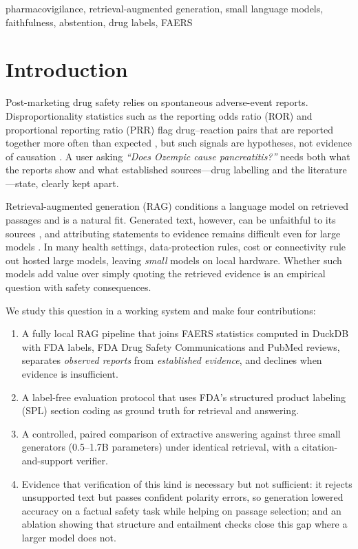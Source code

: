 \documentclass[conference]{IEEEtran}
\begin{document}
\begin{IEEEkeywords}
pharmacovigilance, retrieval-augmented generation, small language models, faithfulness, abstention, drug labels, FAERS
\end{IEEEkeywords}

\section{Introduction}
Post-marketing drug safety relies on spontaneous adverse-event reports. Disproportionality statistics such as the reporting odds ratio (ROR) and proportional reporting ratio (PRR) flag drug--reaction pairs that are reported together more often than expected \cite{evans2001prr,vanpuijenbroek2002ror,noren2013shrinkage}, but such signals are hypotheses, not evidence of causation \cite{hauben2009signal}. A user asking \emph{``Does Ozempic cause pancreatitis?''} needs both what the reports show and what established sources---drug labelling and the literature---state, clearly kept apart.

Retrieval-augmented generation (RAG) \cite{lewis2020rag} conditions a language model on retrieved passages and is a natural fit. Generated text, however, can be unfaithful to its sources \cite{maynez2020faithfulness,ji2023hallucination}, and attributing statements to evidence remains difficult even for large models \cite{gao2023alce,rashkin2023ais}. In many health settings, data-protection rules, cost or connectivity rule out hosted large models, leaving \emph{small} models on local hardware. Whether such models add value over simply quoting the retrieved evidence is an empirical question with safety consequences.

We study this question in a working system and make four contributions:
\begin{enumerate}
\item A fully local RAG pipeline that joins FAERS statistics computed in DuckDB with FDA labels, FDA Drug Safety Communications and PubMed reviews, separates \emph{observed reports} from \emph{established evidence}, and declines when evidence is insufficient.
\item A label-free evaluation protocol that uses FDA's structured product labeling (SPL) section coding as ground truth for retrieval and answering.
\item A controlled, paired comparison of extractive answering against three small generators (0.5--1.7B parameters) under identical retrieval, with a citation-and-support verifier.
\item Evidence that verification of this kind is necessary but not sufficient: it rejects unsupported text but passes confident polarity errors, so generation lowered accuracy on a factual safety task while helping on passage selection; and an ablation showing that structure and entailment checks close this gap where a larger model does not.
\end{enumerate}
\end{document}
